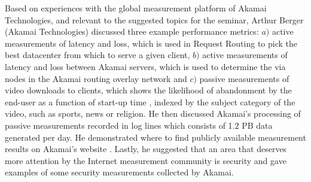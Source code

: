 Based on experiences with the global measurement platform of Akamai
Technologies, and relevant to the suggested topics for the seminar, Arthur
Berger (Akamai Technologies) discussed three example performance metrics: $a)$
active measurements of latency and loss, which is used in Request Routing
\cite{fchen:sigcomm:2015} to pick the best datacenter from which to serve a
given client, $b)$ active measurements of latency and loss between Akamai
servers, which is used to determine the via nodes in the Akamai routing
overlay network \cite{rsitaraman:wiley:2014} and $c)$ passive measurements of
video downloads to clients, which shows the likelihood of abandonment by the
end-user as a function of start-up time \cite{skrishnan:imc:2012}, indexed by
the subject category of the video, such as sports, news or religion.  He then
discussed Akamai's processing of passive measurements recorded in log lines
which consists of 1.2 PB data generated per day. He demonstrated where to find
publicly available measurement results on Akamai's website \cite{soti}.
Lastly, he suggested that an area that deserves more attention by the Internet
measurement community is security and gave examples of some security
measurements collected by Akamai.
